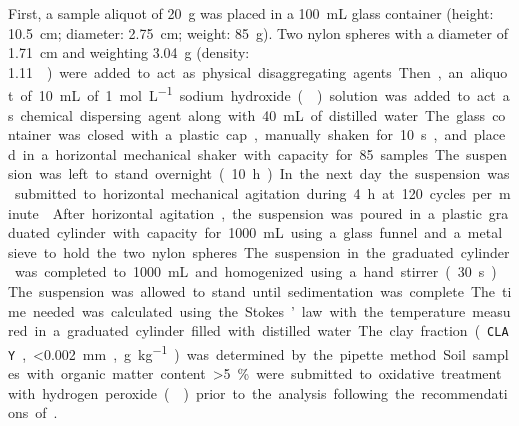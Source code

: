 First, a sample aliquot of \SI{20}{\gram} was placed in a \SI{100}{\milli\liter} glass container (height: 
\SI{10.5}{\centi\metre}; diameter: \SI{2.75}{\centi\metre}; weight: \SI{85}{\gram}). Two nylon spheres with a 
diameter of \SI{1.71}{\centi\metre} and weighting \SI{3.04}{\gram} (density: \SI{1.11}{\g\per\cm\cubic}) were 
added to act as physical disaggregating agents. Then, an aliquot of \SI{10}{\milli\liter} of 
\SI{1}{\mole\per\liter} sodium hydroxide () solution was added to act as chemical dispersing agent 
along with \SI{40}{\milli\liter} of distilled water. The glass container was closed with a plastic cap, 
manually shaken for \SI{10}{\second}, and placed in a horizontal mechanical shaker with capacity for 
\num{85}~samples. The suspension was left to stand overnight (\SI{10}{\hour}). In the next day the suspension 
was submitted to horizontal mechanical agitation during \SI{4}{\hour} at \si{120} cycles per minute 
\cite{SuzukiEtAl2004, SuzukiEtAl2004a}.

After horizontal agitation, the suspension was poured in a plastic graduated cylinder with capacity for 
\SI{1000}{\milli\liter} using a glass funnel and a metal sieve to hold the two nylon spheres. The suspension 
in 
the graduated cylinder was completed to \SI{1000}{\milli\liter} and homogenized using a hand stirrer 
(\SI{30}{\second}). The suspension was allowed to stand until sedimentation was complete. The time needed was 
calculated using the Stokes’ law with the temperature measured in a graduated cylinder filled with distilled 
water.


The clay fraction (\texttt{CLAY}, \SI{<0.002}{\milli\metre}, \si{\gram\per\kilo\gram}) was determined by the 
pipette method. Soil samples with organic matter content \SI{>5}{\percent} were submitted to oxidative 
treatment with hydrogen peroxide () prior to the analysis following the recommendations of
.

%

